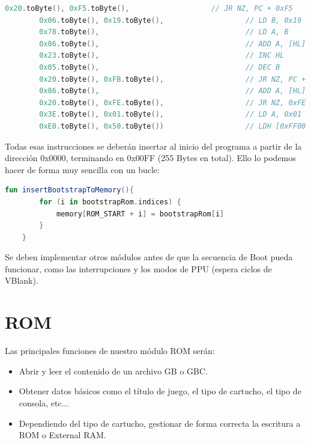\begin{lstlisting}[language=Kotlin, caption={Secuencia de arranque y logo de Nintendo}, label={code:kotlinboot}]
        0x20.toByte(), 0xF5.toByte(),                   // JR NZ, PC + 0xF5
        0x06.toByte(), 0x19.toByte(),                   // LD B, 0x19
        0x78.toByte(),                                  // LD A, B
        0x86.toByte(),                                  // ADD A, [HL]
        0x23.toByte(),                                  // INC HL
        0x05.toByte(),                                  // DEC B
        0x20.toByte(), 0xFB.toByte(),                   // JR NZ, PC + 0xFB
        0x86.toByte(),                                  // ADD A, [HL]
        0x20.toByte(), 0xFE.toByte(),                   // JR NZ, 0xFE
        0x3E.toByte(), 0x01.toByte(),                   // LD A, 0x01
        0xE0.toByte(), 0x50.toByte())                   // LDH [0xFF00 + 0x50], A
\end{lstlisting}

Todas esas instrucciones se deberán insertar al inicio del programa a partir de la dirección 0x0000, terminando en 0x00FF (255 Bytes en total). Ello lo podemos hacer de forma muy sencilla con un bucle:

\begin{lstlisting}[language=Kotlin, caption={Copiado del Boot en memoria}, label={code:kotlinbootcopy}]
    fun insertBootstrapToMemory(){
        for (i in bootstrapRom.indices) {
            memory[ROM_START + i] = bootstrapRom[i]
        }
    }
\end{lstlisting}

Se deben implementar otros módulos antes de que la secuencia de Boot pueda funcionar, como las interrupciones y los modos de PPU (espera ciclos de VBlank).

\section{ROM}

Las principales funciones de nuestro módulo ROM serán:

\begin{itemize}
    \item Abrir y leer el contenido de un archivo GB o GBC.
    \item Obtener datos básicos como el título de juego, el tipo de cartucho, el tipo de consola, etc...
    \item Dependiendo del tipo de cartucho, gestionar de forma correcta la escritura a ROM o External RAM.
\end{itemize}

